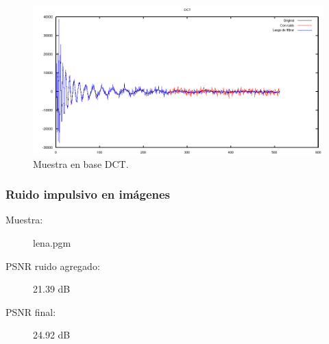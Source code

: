 \documentclass[a4paper,10pt,twoside]{article}
\begin{document}
\begin{figure}[H]
  \centering
  \includegraphics[width=15cm]{graficos/dopp_impulsivo_umbralizar_dct.png} 
  \caption{Muestra en base DCT.}
\end{figure}


\subsubsection{Ruido impulsivo en imágenes}

\begin{description}
  \item[Muestra:] lena.pgm
  \item[PSNR ruido agregado:] 21.39 dB
  \item[PSNR final:] 24.92 dB
\end{description}
\end{document}
